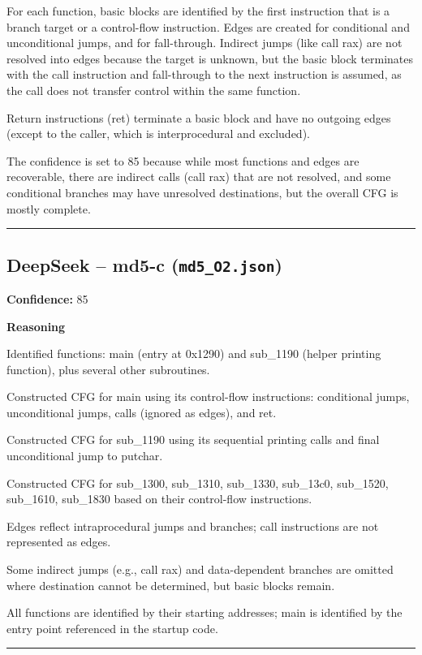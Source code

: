 For each function, basic blocks are identified by the first instruction that is a branch target or a control-flow instruction. Edges are created for conditional and unconditional jumps, and for fall-through. Indirect jumps (like call rax) are not resolved into edges because the target is unknown, but the basic block terminates with the call instruction and fall-through to the next instruction is assumed, as the call does not transfer control within the same function.

Return instructions (ret) terminate a basic block and have no outgoing edges (except to the caller, which is interprocedural and excluded).

The confidence is set to 85 because while most functions and edges are recoverable, there are indirect calls (call rax) that are not resolved, and some conditional branches may have unresolved destinations, but the overall CFG is mostly complete.

\bigskip
\hrule
\bigskip

\subsection{DeepSeek -- md5-c (\texttt{md5\_O2.json})}

\textbf{Confidence:} 85

\textbf{Reasoning}

Identified functions: main (entry at 0x1290) and sub\_1190 (helper printing function), plus several other subroutines.

Constructed CFG for main using its control-flow instructions: conditional jumps, unconditional jumps, calls (ignored as edges), and ret.

Constructed CFG for sub\_1190 using its sequential printing calls and final unconditional jump to putchar.

Constructed CFG for sub\_1300, sub\_1310, sub\_1330, sub\_13c0, sub\_1520, sub\_1610, sub\_1830 based on their control-flow instructions.

Edges reflect intraprocedural jumps and branches; call instructions are not represented as edges.

Some indirect jumps (e.g., call rax) and data-dependent branches are omitted where destination cannot be determined, but basic blocks remain.

All functions are identified by their starting addresses; main is identified by the entry point referenced in the startup code.

\bigskip
\hrule
\bigskip

